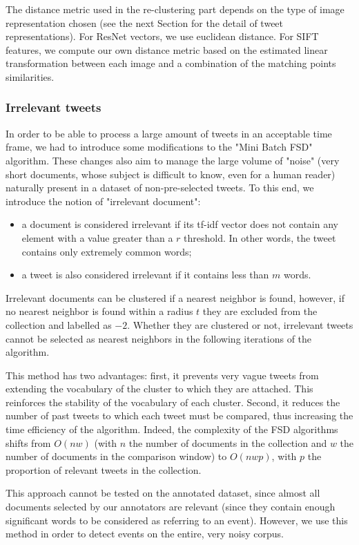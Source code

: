 The distance metric used in the re-clustering part depends on the type of image representation chosen (see the next Section for the detail of tweet representations). For ResNet vectors, we use euclidean distance. For SIFT features, we compute our own distance metric based on the estimated linear transformation between each image and a combination of the matching points similarities.

\subsubsection{Irrelevant tweets}
In order to be able to process a large amount of tweets in an acceptable time frame, we had to introduce some modifications to the "Mini Batch FSD" algorithm. These changes also aim to manage the large volume of "noise" (very short documents, whose subject is difficult to know, even for a human reader) naturally present in a dataset of non-pre-selected tweets. To this end, we introduce the notion of "irrelevant document":
\begin{itemize}
    \item a document is considered irrelevant if its tf-idf vector does not contain any element with a value greater than a $r$ threshold. In other words, the tweet contains only extremely common words;
    \item  a tweet is also considered irrelevant if it contains less than $m$ words. 
\end{itemize}
Irrelevant documents can be clustered if a nearest neighbor is found, however, if no nearest neighbor is found within a radius $t$ they are excluded from the collection and labelled as $-2$. Whether they are clustered or not, irrelevant tweets cannot be selected as nearest neighbors in the following iterations of the algorithm. 

This method has two advantages: first, it prevents very vague tweets from extending the vocabulary of the cluster to which they are attached. This reinforces the stability of the vocabulary of each cluster. Second, it reduces the number of past tweets to which each tweet must be compared, thus increasing the time efficiency of the algorithm. Indeed, the complexity of the FSD algorithms shifts from $O(nw)$ (with $n$ the number of documents in the collection and $w$ the number of documents in the comparison window) to $O(nwp)$, with $p$ the proportion of relevant tweets in the collection. 

This approach cannot be tested on the annotated dataset, since almost all documents selected by our annotators are relevant (since they contain enough significant words to be considered as referring to an event). However, we use this method in order to detect events on the entire, very noisy corpus.

